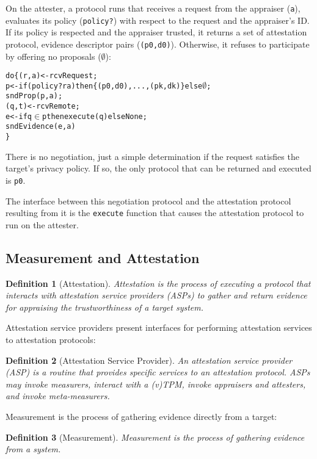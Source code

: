 \documentclass[10pt]{article}
\newtheorem{definition}{Definition}
\begin{document}
On the attester, a protocol runs that receives a request from the
appraiser (\Verb+a+), evaluates its policy (\Verb+policy?+) with
respect to the request and the appraiser's ID.  If its policy is
respected and the appraiser trusted, it returns a set of attestation
protocol, evidence descriptor pairs (\Verb+(p0,d0)+).  Otherwise, it
refuses to participate by offering no proposals ($\emptyset$):

\begin{alltt}
  do \{ (r,a) <- rcvRequest;
       p <- if (policy? r a) then \{(p0,d0),...,(pk,dk)\} else \(\emptyset\);
       sndProp(p,a);
       (q,t) <- rcvRemote;
       e <- if q \(\in\) p then execute(q) else None;
       sndEvidence(e,a)
  \}
\end{alltt}

There is no negotiation, just a simple determination if the request
satisfies the target's privacy policy.  If so, the only protocol that
can be returned and executed is \Verb+p0+.

The interface between this negotiation protocol and the attestation
protocol resulting from it is the \Verb+execute+ function that causes
the attestation protocol to run on the attester.

\subsection*{Measurement and Attestation}

\begin{definition}[Attestation]
  Attestation is the process of executing a protocol that interacts
  with attestation service providers (ASPs) to gather and return evidence for
  appraising the trustworthiness of a target system.
\end{definition}

Attestation service providers present interfaces for performing
attestation services to attestation protocols:

\begin{definition}[Attestation Service Provider]
  An attestation service provider (ASP) is a routine that provides
  specific services to an attestation protocol.  ASPs may invoke
  measurers, interact with a (v)TPM, invoke appraisers and attesters,
  and invoke meta-measurers.
\end{definition}

Measurement is the process of gathering evidence directly from a target:

\begin{definition}[Measurement]
  Measurement is the process of gathering evidence from a system.
\end{definition}
\end{document}
